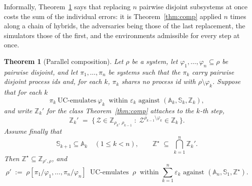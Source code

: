\documentclass[11pt,a4paper]{article}
\newcommand{\Zenv}{\mathcal{Z}}
\newcommand{\Aset}{\mathbb{A}}
\newcommand{\SimSet}{\mathbb{S}}
\newcommand{\ZenvSet}{\mathbb{Z}}
\theoremstyle{accentdef}
\theoremstyle{accentplain}
\newtheorem{theorem}[definition]{Theorem}
\begin{document}
Informally, Theorem~\ref{thm:parcomp} says that replacing $n$ pairwise disjoint subsystems at
once costs the sum of the individual errors: it is Theorem~\ref{thm:comp} applied $n$ times
along a chain of hybrids, the adversaries being those of the last replacement, the simulators
those of the first, and the environments admissible for every step at once.

\begin{theorem}[Parallel composition]\label{thm:parcomp}
Let $\rho$ be a system, let $\varphi_1,\ldots,\varphi_n \subseteq \rho$ be pairwise disjoint,
and let $\pi_1,\ldots,\pi_n$ be systems such that the $\pi_k$ carry pairwise disjoint process
ids and, for each $k$, $\pi_k$ shares no process id with $\rho \setminus \varphi_k$. Suppose
that for each $k$
\[
  \pi_k \ \text{UC-emulates} \ \varphi_k \ \text{ within } \varepsilon_k \text{ against } (\Aset_k,\SimSet_k,\ZenvSet_k) ,
\]
and write $\ZenvSet_k'$ for the class Theorem~\ref{thm:comp} attaches to the $k$-th step,
\[
  \ZenvSet_k' \;=\; \bigl\{\, \Zenv \in \ZenvSet_{\rho_k,\,\rho_{k-1}} \;:\; \Zenv^{\rho_{k-1} \setminus \varphi_k} \in \ZenvSet_k \,\bigr\} .
\]
Assume finally that
\[
  \SimSet_{k+1} \subseteq \Aset_k \quad (1 \leq k < n),
  \qquad
  \ZenvSet^{\star} \;\subseteq\; \bigcap_{k=1}^{n} \ZenvSet_k' .
\]
Then $\ZenvSet^{\star} \subseteq \ZenvSet_{\rho',\rho}$, and
\[
  \rho' \;:=\; \rho[\pi_1/\varphi_1,\ldots,\pi_n/\varphi_n]
  \ \text{ UC-emulates } \ \rho
  \ \text{ within } \sum_{k=1}^{n} \varepsilon_k
  \text{ against } (\Aset_n,\SimSet_1,\ZenvSet^{\star}) .
\]
\end{theorem}
\end{document}
